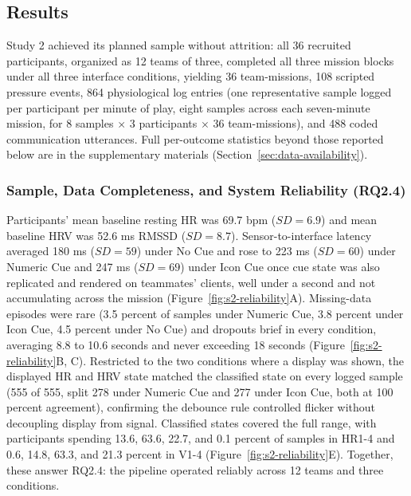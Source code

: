 \documentclass[manuscript,review,anonymous]{acmart}
\begin{document}
\subsection{Results}
\label{sec:study2-results}
Study 2 achieved its planned sample without attrition: all 36 recruited participants, organized as 12 teams of three, completed all three mission blocks under all three interface conditions, yielding 36 team-missions, 108 scripted pressure events, 864 physiological log entries (one representative sample logged per participant per minute of play, eight samples across each seven-minute mission, for 8 samples $\times$ 3 participants $\times$ 36 team-missions), and 488 coded communication utterances. Full per-outcome statistics beyond those reported below are in the supplementary materials (Section~\ref{sec:data-availability}).

\subsubsection{Sample, Data Completeness, and System Reliability (RQ2.4)}
\label{sec:s2-reliability}
Participants' mean baseline resting HR was 69.7 bpm ($SD=6.9$) and mean baseline HRV was 52.6 ms RMSSD ($SD=8.7$). Sensor-to-interface latency averaged 180 ms ($SD=59$) under No Cue and rose to 223 ms ($SD=60$) under Numeric Cue and 247 ms ($SD=69$) under Icon Cue once cue state was also replicated and rendered on teammates' clients, well under a second and not accumulating across the mission (Figure~\ref{fig:s2-reliability}A). Missing-data episodes were rare (3.5 percent of samples under Numeric Cue, 3.8 percent under Icon Cue, 4.5 percent under No Cue) and dropouts brief in every condition, averaging 8.8 to 10.6 seconds and never exceeding 18 seconds (Figure~\ref{fig:s2-reliability}B, C). Restricted to the two conditions where a display was shown, the displayed HR and HRV state matched the classified state on every logged sample (555 of 555, split 278 under Numeric Cue and 277 under Icon Cue, both at 100 percent agreement), confirming the debounce rule controlled flicker without decoupling display from signal. Classified states covered the full range, with participants spending 13.6, 63.6, 22.7, and 0.1 percent of samples in HR1-4 and 0.6, 14.8, 63.3, and 21.3 percent in V1-4 (Figure~\ref{fig:s2-reliability}E). Together, these answer RQ2.4: the pipeline operated reliably across 12 teams and three conditions.
\end{document}
